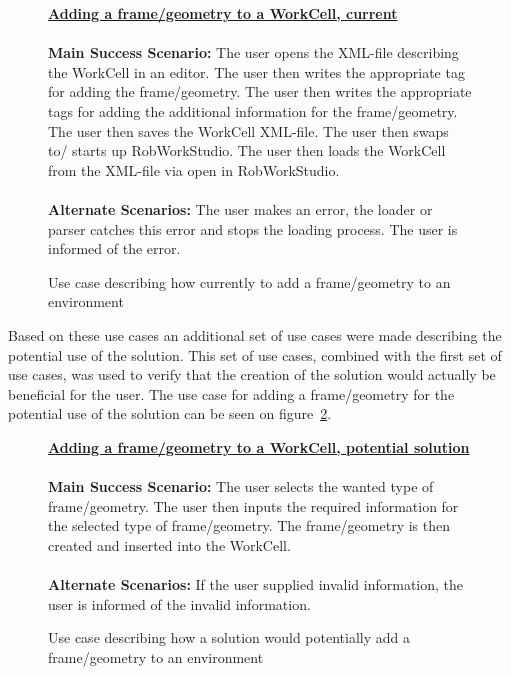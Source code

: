 \begin{figure}
\begin{framed}
\underline{\textbf{Adding a frame/geometry to a WorkCell, current}}\\\\
\textbf{Main Success Scenario:} The user opens the XML-file describing the WorkCell in an editor. The user then writes the appropriate tag for adding the frame/geometry. The user then writes the appropriate tags for adding the additional information for the frame/geometry. The user then saves the WorkCell XML-file. The user then swaps to/ starts up RobWorkStudio. The user then loads the WorkCell from the XML-file via open in RobWorkStudio.\\\\
\textbf{Alternate Scenarios:} The user makes an error, the loader or parser catches this error and stops the loading process. The user is informed of the error.
\end{framed}
\caption{Use case describing how currently to add a frame/geometry to an environment}
\label{fig:currentUseCase}
\end{figure}

Based on these use cases an additional set of use cases were made describing the potential use of the solution. This set of use cases, combined with the first set of use cases, was used to verify that the creation of the solution would actually be beneficial for the user. The use case for adding a frame/geometry for the potential use of the solution can be seen on figure~\ref{fig:pluginUseCase}.

\begin{figure}
\begin{framed}
\underline{\textbf{Adding a frame/geometry to a WorkCell, potential solution}}\\\\
\textbf{Main Success Scenario:} The user selects the wanted type of frame/geometry. The user then inputs the required information for the selected type of frame/geometry. The frame/geometry is then created and inserted into the WorkCell.\\\\
\textbf{Alternate Scenarios:} If the user supplied invalid information, the user is informed of the invalid information.
\end{framed}
\caption{Use case describing how a solution would potentially add a frame/geometry to an environment}
\label{fig:pluginUseCase}
\end{figure}


